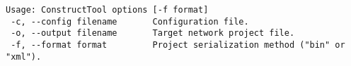 \begin{verbatim}
Usage: ConstructTool options [-f format]
 -c, --config filename       Configuration file.
 -o, --output filename       Target network project file.
 -f, --format format         Project serialization method ("bin" or "xml").
\end{verbatim}

